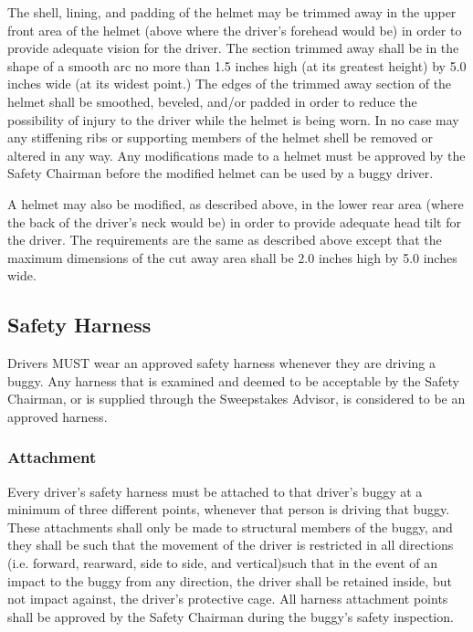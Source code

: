 \documentclass[openany]{book}
\begin{document}
The shell, lining, and padding of the helmet may be trimmed away in the upper front area of the helmet (above where the driver's forehead would be) in order to provide adequate vision for the driver. The section trimmed away shall be in the shape of a smooth arc no more than 1.5 inches high (at its greatest height) by 5.0 inches wide (at its widest point.) The edges of the trimmed away section of the helmet shall be smoothed, beveled, and/or padded in order to reduce the possibility of injury to the driver while the helmet is being worn. In no case may any stiffening ribs or supporting members of the helmet shell be removed or altered in any way. Any modifications made to a helmet must be approved by the Safety Chairman before the modified helmet can be used by a buggy driver.

A helmet may also be modified, as described above, in the lower rear area (where the back of the driver's neck would be) in order to provide adequate head tilt for the driver. The requirements are the same as described above except that the maximum dimensions of the cut away area shall be 2.0 inches high by 5.0 inches wide.

\subsection{Safety Harness}

Drivers MUST wear an approved safety harness whenever they are driving a buggy. Any harness that is examined and deemed to be acceptable by the Safety Chairman, or is supplied through the Sweepstakes Advisor, is considered to be an approved harness.

\subsubsection{Attachment}

Every driver's safety harness must be attached to that driver's buggy at a minimum of three different points, whenever that person is driving that buggy. These attachments shall only be made to structural members of the buggy, and they shall be such that the movement of the driver is restricted in all directions (i.e. forward, rearward, side to side, and vertical)such that in the event of an impact to the buggy from any direction, the driver shall be retained inside, but not impact against, the driver's protective cage. All harness attachment points shall be approved by the Safety Chairman during the buggy's safety inspection.
\end{document}

